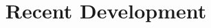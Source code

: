 \documentclass[hyperref={pdfpagelabels=false}]{beamer}
\begin{document}

\title[]{Recent Development}
\author{}
\institute{}
\date{}

\begin{frame}{}
\titlepage
\end{frame}
\end{document}
